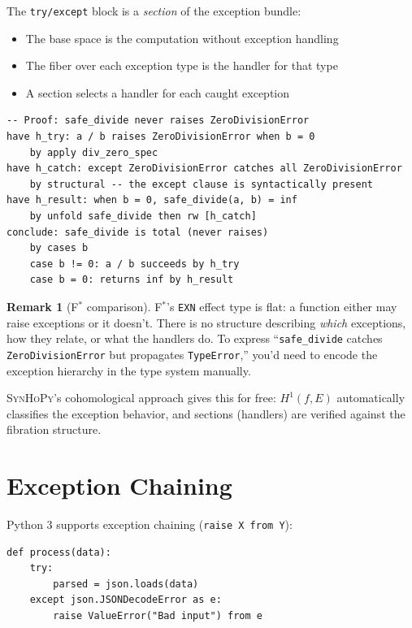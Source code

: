 \documentclass[11pt,a4paper]{report}
\theoremstyle{definition}
\newtheorem{remark}[definition]{Remark}
\theoremstyle{plain}
\newcommand{\fstar}{F$^{*}$}
\newcommand{\synhopy}{\textsc{SynHoPy}}
\begin{document}
The \texttt{try/except} block is a \emph{section} of the exception bundle:
\begin{itemize}
  \item The base space is the computation without exception handling
  \item The fiber over each exception type is the handler for that type
  \item A section selects a handler for each caught exception
\end{itemize}

\begin{lstlisting}[style=proof]
-- Proof: safe_divide never raises ZeroDivisionError
have h_try: a / b raises ZeroDivisionError when b = 0
    by apply div_zero_spec
have h_catch: except ZeroDivisionError catches all ZeroDivisionError
    by structural -- the except clause is syntactically present
have h_result: when b = 0, safe_divide(a, b) = inf
    by unfold safe_divide then rw [h_catch]
conclude: safe_divide is total (never raises)
    by cases b
    case b != 0: a / b succeeds by h_try
    case b = 0: returns inf by h_result
\end{lstlisting}

\begin{remark}[\fstar{} comparison]
\fstar{}'s \lstinline[style=fstar]{EXN} effect type is flat: a function either
may raise exceptions or it doesn't. There is no structure describing \emph{which}
exceptions, how they relate, or what the handlers do. To express
``\texttt{safe\_divide} catches \texttt{ZeroDivisionError} but propagates
\texttt{TypeError},'' you'd need to encode the exception hierarchy in the type
system manually.

\synhopy{}'s cohomological approach gives this for free: $H^1(f, E)$ automatically
classifies the exception behavior, and sections (handlers) are verified against
the fibration structure.
\end{remark}

\section{Exception Chaining}

Python 3 supports exception chaining (\texttt{raise X from Y}):
\begin{lstlisting}[style=python]
def process(data):
    try:
        parsed = json.loads(data)
    except json.JSONDecodeError as e:
        raise ValueError("Bad input") from e
\end{lstlisting}
\end{document}
